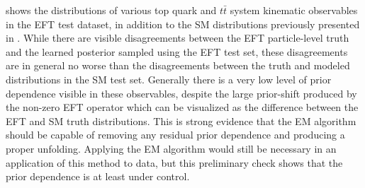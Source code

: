  shows the distributions of various top quark and $t\bar{t}$ system kinematic observables in the EFT test dataset, in addition to the SM distributions previously presented in .
While there are visible disagreements between the EFT particle-level truth and the learned posterior sampled using the EFT test set, these disagreements are in general no worse than the disagreements between the truth and modeled distributions in the SM test set.
Generally there is a very low level of prior dependence visible in these observables, despite the large prior-shift produced by the non-zero EFT operator which can be visualized as the difference between the EFT and SM truth distributions.
This is strong evidence that the EM algorithm should be capable of removing any residual prior dependence and producing a proper unfolding.
Applying the EM algorithm would still be necessary in an application of this method to data, but this preliminary check shows that the prior dependence is at least under control.

